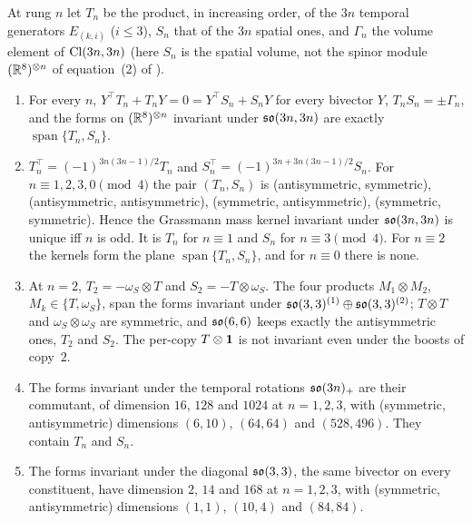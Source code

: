 \begin{theorem}
\label{e6:thm:ladder}
At rung $n$ let $T_n$ be the product, in increasing order, of the $3n$ temporal generators $E_{(k,i)}$ ($i\le3$), $S_n$ that of the $3n$ spatial ones, and
$\Gamma_n$ the volume element of $\mathrm{Cl}(3n,3n)$ (here $S_n$ is the spatial volume, not the spinor module $(\mathbb{R}^8)^{\otimes n}$ of equation~(2) of \cite{ES17}).
\begin{enumerate}[label=(\roman*),leftmargin=2.2em]
\item For every $n$, $Y^{\!\top}T_n+T_nY=0=Y^{\!\top}S_n+S_nY$ for every bivector $Y$, $T_nS_n=\pm\Gamma_n$, and the forms on $(\mathbb{R}^8)^{\otimes n}$ invariant under
$\mathfrak{so}(3n,3n)$ are exactly $\operatorname{span}\{T_n,S_n\}$.
\item $T_n^{\!\top}=(-1)^{3n(3n-1)/2}T_n$ and $S_n^{\!\top}=(-1)^{3n+3n(3n-1)/2}S_n$. For $n\equiv1,2,3,0\pmod4$ the pair $(T_n,S_n)$ is (antisymmetric,
symmetric), (antisymmetric, antisymmetric), (symmetric, antisymmetric), (symmetric, symmetric). Hence the Grassmann mass kernel invariant under
$\mathfrak{so}(3n,3n)$ is unique iff $n$ is odd. It is $T_n$ for $n\equiv1$ and $S_n$ for $n\equiv3\pmod4$. For $n\equiv2$ the kernels form the plane $\operatorname{span}\{T_n,S_n\}$,
and for $n\equiv0$ there is none.
\item At $n=2$, $T_2=-\omega_S\otimes T$ and $S_2=-T\otimes\omega_S$. The four products $M_1\otimes M_2$, $M_k\in\{T,\omega_S\}$, span the forms invariant under
$\mathfrak{so}(3,3)^{(1)}\oplus\mathfrak{so}(3,3)^{(2)}$; $T\otimes T$ and $\omega_S\otimes\omega_S$ are symmetric, and $\mathfrak{so}(6,6)$ keeps exactly the antisymmetric ones,
$T_2$ and $S_2$. The per-copy $T\otimes\mathbf 1$ is not invariant even under the boosts of copy~$2$.
\item The forms invariant under the temporal rotations $\mathfrak{so}(3n)_+$ are their commutant, of dimension $16$, $128$ and $1024$ at $n=1,2,3$, with
(symmetric, antisymmetric) dimensions $(6,10)$, $(64,64)$ and $(528,496)$. They contain $T_n$ and $S_n$.
\item The forms invariant under the diagonal $\mathfrak{so}(3,3)$, the same bivector on every constituent, have dimension $2$, $14$ and $168$ at $n=1,2,3$, with
(symmetric, antisymmetric) dimensions $(1,1)$, $(10,4)$ and $(84,84)$.
\end{enumerate}
\end{theorem}

